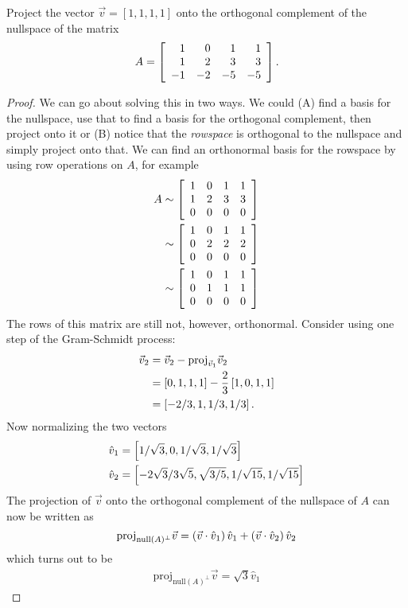 \documentclass{tutorial}
\begin{document}
\begin{prob}
Project the vector $\vec{v} = [1,1,1,1]$ onto the orthogonal complement of the nullspace of the matrix
\[
    A = \left[ \begin{array}{rrrr}
      1 &  0 &  1 &  1 \\
      1 &  2 &  3 &  3 \\
     -1 & -2 & -5 & -5
    \end{array} \right] .
\]
\end{prob} \ifsolns \begin{proof}
We can go about solving this in two ways. We could (A) find a basis for the nullspace, use that to find a basis for the orthogonal complement, then project onto it or (B) notice that the \emph{rowspace} is orthogonal to the nullspace and simply project onto that. We can find an orthonormal basis for the rowspace by using row operations on $A$, for example
\begin{align*}
  A & \sim \left[ \begin{array}{rrrr}
      1 &  0 &  1 &  1 \\
      1 &  2 &  3 &  3 \\
      0 &  0 &  0 &  0
    \end{array} \right] \\
    & \sim \left[ \begin{array}{rrrr}
      1 &  0 &  1 &  1 \\
      0 &  2 &  2 &  2 \\
      0 &  0 &  0 &  0
    \end{array} \right] \\
    & \sim \left[ \begin{array}{rrrr}
      1 &  0 &  1 &  1 \\
      0 &  1 &  1 &  1 \\
      0 &  0 &  0 &  0
    \end{array} \right]
\end{align*}
The rows of this matrix are still not, however, orthonormal. Consider using one step of the Gram-Schmidt process:
\begin{align*}
  \vec{v}_2
  & = \vec{v}_2 - \text{proj}_{\vec{v}_1} \vec{v}_2 \\
  & = \left[ 0,1,1,1 \right] - \frac{2}{3} \left[ 1,0,1,1\right] \\
  & = \left[-2/3, 1, 1/3, 1/3 \right].
\end{align*}
Now normalizing the two vectors
\begin{align*}
  \hat{v}_1 &= \left[ 1/\sqrt{3}, 0 , 1/\sqrt{3}, 1/\sqrt{3} \right] \\
  \hat{v}_2 &= \left[ -2\sqrt{3}/3\sqrt{5}, \sqrt{3/5}, 1/\sqrt{15}, 1/\sqrt{15} \right]
\end{align*}
The projection of $\vec{v}$ onto the orthogonal complement of the nullspace of $A$ can now be written as
\[
  \text{proj}_{\text{null}(A)^{\perp}} \vec{v} = \left( \vec{v} \cdot \hat{v}_1 \right) \hat{v}_1 + \left( \vec{v} \cdot \hat{v}_2 \right) \hat{v}_2
\]
which turns out to be
\begin{align*}
  \text{proj}_{\text{null}(A)^{\perp}} \vec{v} = \sqrt{3} \hat{v}_1
\end{align*}
\end{proof}\else \newpage \fi
\end{document}
